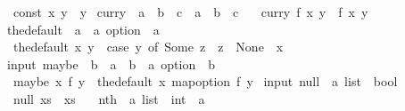 \begin{isabellebody}
\ \ {\isachardoublequoteopen}const\ x\ y\ {\isasymequiv}\ y{\isachardoublequoteclose}\isanewline
\isanewline
{}\isamarkupfalse%
\ curry\ {\isacharcolon}{\isacharcolon}\ {\isachardoublequoteopen}{\isacharparenleft}{\isacharprime}a\ {\isasymtimes}\ {\isacharprime}b\ {\isasymRightarrow}\ {\isacharprime}c{\isacharparenright}\ {\isasymRightarrow}\ {\isacharprime}a\ {\isasymRightarrow}\ {\isacharprime}b\ {\isasymRightarrow}\ {\isacharprime}c{\isachardoublequoteclose}\ \isanewline
\ \ {\isachardoublequoteopen}curry\ f\ x\ y\ {\isacharequal}\ f\ {\isacharparenleft}x{\isacharcomma}\ y{\isacharparenright}{\isachardoublequoteclose}%
\isamarkuptrue%
\isamarkupfalse%
\ the{\isacharunderscore}default\ {\isacharcolon}{\isacharcolon}\ {\isachardoublequoteopen}{\isacharprime}a\ {\isasymRightarrow}\ {\isacharprime}a\ option\ {\isasymRightarrow}\ {\isacharprime}a{\isachardoublequoteclose}\ \isanewline
\ \ {\isachardoublequoteopen}the{\isacharunderscore}default\ x\ y\ {\isacharequal}\ {\isacharparenleft}case\ y\ of\ Some\ z\ {\isasymRightarrow}\ z\ {\isacharbar}\ None\ {\isasymRightarrow}\ x{\isacharparenright}{\isachardoublequoteclose}\isanewline
\isanewline
{}\isamarkupfalse%
\ {\isacharparenleft}input{\isacharparenright}\ maybe\ {\isacharcolon}{\isacharcolon}\ {\isachardoublequoteopen}{\isacharprime}b\ {\isasymRightarrow}\ {\isacharparenleft}{\isacharprime}a\ {\isasymRightarrow}\ {\isacharprime}b{\isacharparenright}\ {\isasymRightarrow}\ {\isacharprime}a\ option\ {\isasymRightarrow}\ {\isacharprime}b{\isachardoublequoteclose}\ \isanewline
\ \ {\isachardoublequoteopen}maybe\ x\ f\ y\ {\isasymequiv}\ the{\isacharunderscore}default\ x\ {\isacharparenleft}map{\isacharunderscore}option\ f\ y{\isacharparenright}{\isachardoublequoteclose}%
\isamarkuptrue%
\isamarkupfalse%
\ {\isacharparenleft}input{\isacharparenright}\ null\ {\isacharcolon}{\isacharcolon}\ {\isachardoublequoteopen}{\isacharprime}a\ list\ {\isasymRightarrow}\ bool{\isachardoublequoteclose}\ \isanewline
\ \ {\isachardoublequoteopen}null\ xs\ {\isasymequiv}\ xs\ {\isacharequal}\ {\isacharbrackleft}{\isacharbrackright}{\isachardoublequoteclose}\isanewline
\isanewline
\isanewline
{}\isamarkupfalse%
\ nth\ {\isacharcolon}{\isacharcolon}\ {\isachardoublequoteopen}{\isacharprime}a\ list\ {\isasymRightarrow}\ int\ {\isasymRightarrow}\ {\isacharprime}a{\isachardoublequoteclose}\ \isanewline

\end{isabellebody}
